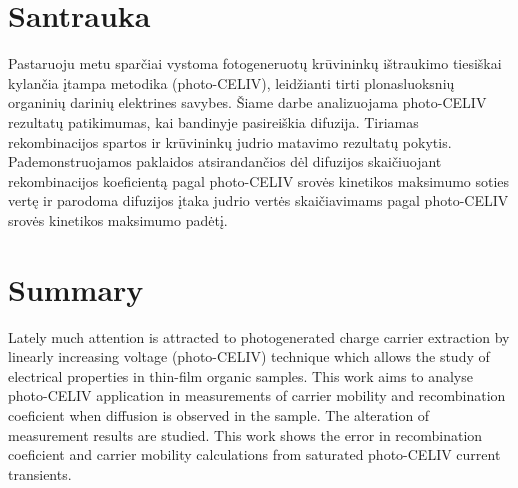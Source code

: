 \section*{Santrauka}
Pastaruoju metu sparčiai vystoma fotogeneruotų krūvininkų ištraukimo tiesiškai kylančia įtampa metodika (photo-CELIV), leidžianti tirti plonasluoksnių organinių darinių elektrines savybes. Šiame darbe analizuojama photo-CELIV rezultatų patikimumas, kai bandinyje pasireiškia difuzija. Tiriamas rekombinacijos spartos ir krūvininkų judrio matavimo rezultatų pokytis. Pademonstruojamos paklaidos atsirandančios dėl difuzijos skaičiuojant rekombinacijos koeficientą pagal photo-CELIV srovės kinetikos maksimumo soties vertę ir parodoma difuzijos įtaka judrio vertės skaičiavimams pagal photo-CELIV srovės kinetikos maksimumo padėtį.

\section*{Summary} 
Lately much attention is attracted to photogenerated charge carrier extraction by linearly increasing voltage (photo-CELIV) technique which allows the study of electrical properties in thin-film organic samples. This work aims to analyse photo-CELIV application in measurements of carrier mobility and recombination coeficient when diffusion is observed in the sample. The alteration of measurement results are studied. This work shows the error in recombination coeficient and carrier mobility calculations from saturated photo-CELIV current transients.